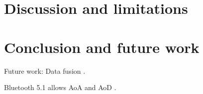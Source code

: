 \chapter{Discussion and limitations}
\label{chap:discussion}
\chapter{Conclusion and future work}
\label{chap:conclusion}

Future work: Data fusion \cite{barsocchi_detecting_2021}.

Bluetooth 5.1 allows AoA and AoD \cite{barsocchi_detecting_2021}.